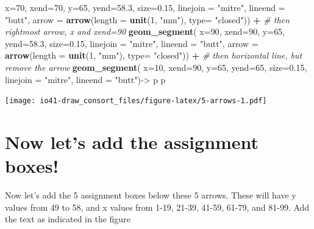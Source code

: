 \documentclass[
]{book}
\newenvironment{Shaded}{\begin{snugshade}}{\end{snugshade}}
\newcommand{\CommentTok}[1]{\textcolor[rgb]{0.56,0.35,0.01}{\textit{#1}}}
\newcommand{\DataTypeTok}[1]{\textcolor[rgb]{0.13,0.29,0.53}{#1}}
\newcommand{\DecValTok}[1]{\textcolor[rgb]{0.00,0.00,0.81}{#1}}
\newcommand{\FloatTok}[1]{\textcolor[rgb]{0.00,0.00,0.81}{#1}}
\newcommand{\KeywordTok}[1]{\textcolor[rgb]{0.13,0.29,0.53}{\textbf{#1}}}
\newcommand{\NormalTok}[1]{#1}
\newcommand{\OperatorTok}[1]{\textcolor[rgb]{0.81,0.36,0.00}{\textbf{#1}}}
\newcommand{\StringTok}[1]{\textcolor[rgb]{0.31,0.60,0.02}{#1}}
\begin{document}
\begin{Shaded}
\begin{Highlighting}[]
    \DataTypeTok{x=}\DecValTok{70}\NormalTok{, }\DataTypeTok{xend=}\DecValTok{70}\NormalTok{, }\DataTypeTok{y=}\DecValTok{65}\NormalTok{, }\DataTypeTok{yend=}\FloatTok{58.3}\NormalTok{, }
    \DataTypeTok{size=}\FloatTok{0.15}\NormalTok{, }\DataTypeTok{linejoin =} \StringTok{"mitre"}\NormalTok{, }\DataTypeTok{lineend =} \StringTok{"butt"}\NormalTok{,}
    \DataTypeTok{arrow =} \KeywordTok{arrow}\NormalTok{(}\DataTypeTok{length =} \KeywordTok{unit}\NormalTok{(}\DecValTok{1}\NormalTok{, }\StringTok{"mm"}\NormalTok{), }\DataTypeTok{type=} \StringTok{"closed"}\NormalTok{)) }\OperatorTok{+}
\CommentTok{# then rightmost arrow, x and xend=90}
\StringTok{  }\KeywordTok{geom_segment}\NormalTok{(}
    \DataTypeTok{x=}\DecValTok{90}\NormalTok{, }\DataTypeTok{xend=}\DecValTok{90}\NormalTok{, }\DataTypeTok{y=}\DecValTok{65}\NormalTok{, }\DataTypeTok{yend=}\FloatTok{58.3}\NormalTok{, }
    \DataTypeTok{size=}\FloatTok{0.15}\NormalTok{, }\DataTypeTok{linejoin =} \StringTok{"mitre"}\NormalTok{, }\DataTypeTok{lineend =} \StringTok{"butt"}\NormalTok{,}
    \DataTypeTok{arrow =} \KeywordTok{arrow}\NormalTok{(}\DataTypeTok{length =} \KeywordTok{unit}\NormalTok{(}\DecValTok{1}\NormalTok{, }\StringTok{"mm"}\NormalTok{), }\DataTypeTok{type=} \StringTok{"closed"}\NormalTok{)) }\OperatorTok{+}
\StringTok{  }\CommentTok{# then horizontal line, but remove the arrow}
\StringTok{  }\KeywordTok{geom_segment}\NormalTok{(}
    \DataTypeTok{x=}\DecValTok{10}\NormalTok{, }\DataTypeTok{xend=}\DecValTok{90}\NormalTok{, }\DataTypeTok{y=}\DecValTok{65}\NormalTok{, }\DataTypeTok{yend=}\DecValTok{65}\NormalTok{, }
    \DataTypeTok{size=}\FloatTok{0.15}\NormalTok{, }\DataTypeTok{linejoin =} \StringTok{"mitre"}\NormalTok{, }\DataTypeTok{lineend =} \StringTok{"butt"}\NormalTok{)->}
\StringTok{  }\NormalTok{p}
\NormalTok{p}
\end{Highlighting}
\end{Shaded}

\texttt{[image: io41-draw\_consort\_files/figure-latex/5-arrows-1.pdf]}

\hypertarget{now-lets-add-the-assignment-boxes}{%
\section{Now let's add the assignment boxes!}\label{now-lets-add-the-assignment-boxes}}

Now let's add the 5 assignment boxes below these 5 arrows. These will have y values from 49 to 58, and x values from 1-19, 21-39, 41-59, 61-79, and 81-99. Add the text as indicated in the figure
\end{document}
